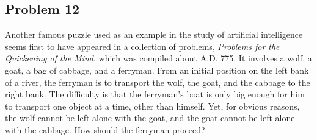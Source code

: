 \documentclass[14pt]{extarticle}
\begin{document}
\subsection{Problem 12}
Another famous puzzle used as an example in the study of artificial
intelligence seems first to have appeared in a collection of problems, {\it
Problems for the Quickening of the Mind}, which was compiled about A.D. 775. It
involves a wolf, a goat, a bag of cabbage, and a ferryman. From an initial
position on the left bank of a river, the ferryman is to transport the wolf,
the goat, and the cabbage to the right bank. The difficulty is that the
ferryman’s boat is only big enough for him to transport one object at a time,
other than himself. Yet, for obvious reasons, the wolf cannot be left alone with
the goat, and the goat cannot be left alone with the cabbage. How should the
ferryman proceed?
\end{document}
